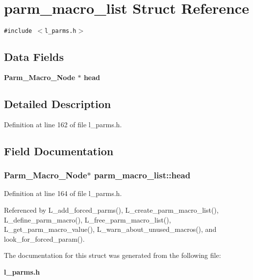 \section{parm\_\-macro\_\-list Struct Reference}
\label{structparm__macro__list}
{\tt \#include $<$l\_\-parms.h$>$}

\subsection*{Data Fields}
\begin{CompactItemize}
\item 
\bf{Parm\_\-Macro\_\-Node} $\ast$ \bf{head}
\end{CompactItemize}


\subsection{Detailed Description}




Definition at line 162 of file l\_\-parms.h.

\subsection{Field Documentation}
\subsubsection{\setlength{\rightskip}{0pt plus 5cm}\bf{Parm\_\-Macro\_\-Node}$\ast$ \bf{parm\_\-macro\_\-list::head}}\label{structparm__macro__list_6262d1366bf926ee7a1dfe28c0102dbf}




Definition at line 164 of file l\_\-parms.h.

Referenced by L\_\-add\_\-forced\_\-parms(), L\_\-create\_\-parm\_\-macro\_\-list(), L\_\-define\_\-parm\_\-macro(), L\_\-free\_\-parm\_\-macro\_\-list(), L\_\-get\_\-parm\_\-macro\_\-value(), L\_\-warn\_\-about\_\-unused\_\-macros(), and look\_\-for\_\-forced\_\-param().

The documentation for this struct was generated from the following file:\begin{CompactItemize}
\item 
\bf{l\_\-parms.h}\end{CompactItemize}
